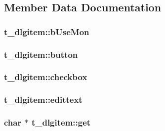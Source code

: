 \begin{DoxyCompactItemize}
\begin{tabbing}
\end{tabbing}\end{DoxyCompactItemize}


\subsection{\-Member \-Data \-Documentation}
\hypertarget{structt__dlgitem_aa7aca5aed540a24bb355213e702229c0}{
\subsubsection[{b\-Use\-Mon}]{ {\bf t\-\_\-dlgitem\-::b\-Use\-Mon}}}\label{structt__dlgitem_aa7aca5aed540a24bb355213e702229c0}
\hypertarget{structt__dlgitem_a2f6d08290b31ebd28d50cbbc23b7c67e}{
\subsubsection[{button}]{ {\bf t\-\_\-dlgitem\-::button}}}\label{structt__dlgitem_a2f6d08290b31ebd28d50cbbc23b7c67e}
\hypertarget{structt__dlgitem_a13c8fcf0cb47e5cd6a6d719f01abfdde}{
\subsubsection[{checkbox}]{ {\bf t\-\_\-dlgitem\-::checkbox}}}\label{structt__dlgitem_a13c8fcf0cb47e5cd6a6d719f01abfdde}
\hypertarget{structt__dlgitem_a0d11a3521aeeaeaf7c33ded23ae47693}{
\subsubsection[{edittext}]{ {\bf t\-\_\-dlgitem\-::edittext}}}\label{structt__dlgitem_a0d11a3521aeeaeaf7c33ded23ae47693}
\hypertarget{structt__dlgitem_af0bfaa74c5d1e683a79409572be8994f}{
\subsubsection[{get}]{\setlength{\rightskip}{0pt plus 5cm}char $\ast$ {\bf t\-\_\-dlgitem\-::get}}}\label{structt__dlgitem_af0bfaa74c5d1e683a79409572be8994f}
